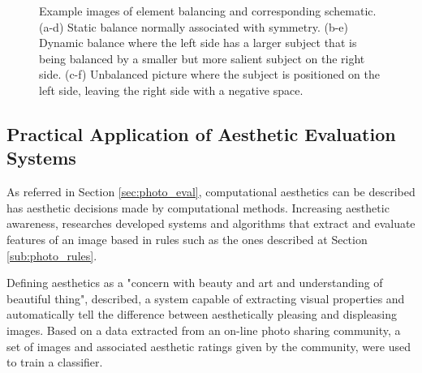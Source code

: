 \begin{figure}[htbp]
        \centering
  \caption{Example images of element balancing and corresponding schematic. (a-d) Static balance normally associated with symmetry. (b-e) Dynamic balance where the left side has a larger subject that is being balanced by a smaller but more salient subject on the right side. (c-f) Unbalanced picture where the subject is positioned on the left side, leaving the right side with a negative space.}
  \label{fig:balance_elements_image}
\end{figure}

\subsection{Practical Application of Aesthetic Evaluation Systems}
\label{sub:eval_applications}

As referred in Section \ref{sec:photo_eval}, computational aesthetics can be described has aesthetic decisions made by computational methods. Increasing aesthetic awareness, researches developed systems and algorithms that extract and evaluate features of an image based in rules such as the ones described at Section \ref{sub:photo_rules}.

Defining aesthetics as a "concern with beauty and art and understanding of beautiful thing", \citeauthor{datta2006studying} \cite{datta2006studying} described, a system capable of extracting visual properties and automatically tell the difference between aesthetically pleasing and displeasing images. 
Based on a data extracted from an on-line photo sharing community, a set of images and associated aesthetic ratings given by the community, were used to train a classifier.

